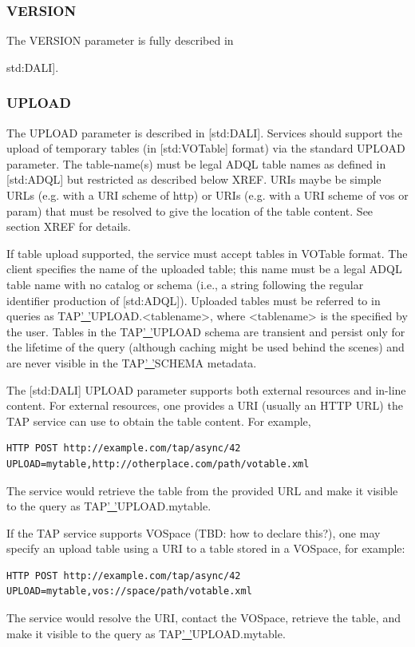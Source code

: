\documentclass[11pt,letter]{ivoa}
\begin{document}
\subsubsection{VERSION}
The VERSION parameter is fully described in {std:DALI].

\subsubsection{UPLOAD}
\label{sec:UPLOAD}

The UPLOAD parameter is described in [std:DALI]. Services should support the 
upload of temporary tables (in [std:VOTable] format) via the standard UPLOAD 
parameter. The table-name(s) must be legal ADQL table names as defined in 
[std:ADQL] but restricted as described below XREF. URIs maybe be simple URLs 
(e.g. with a URI scheme of http) or URIs (e.g. with a URI scheme of vos or 
param) that must be resolved to give the location of the table content. See 
section XREF for details.

If table upload supported, the service must accept tables in VOTable format. 
The client specifies the name of the uploaded table; this name must be a legal 
ADQL table name with no catalog or schema (i.e., a string following the 
regular identifier production of [std:ADQL]). Uploaded tables must be referred 
to in queries as TAP\underline{' '}UPLOAD.<tablename>, where <tablename> is the 
specified by the user. Tables in the TAP\underline{' '}UPLOAD schema are 
transient and persist only for the lifetime of the query (although caching might 
be used behind the scenes) and are never visible in the 
TAP\underline{' '}SCHEMA metadata.

The [std:DALI] UPLOAD parameter supports both external resources and in-line 
content. For external resources, one provides a URI (usually an HTTP URL) the 
TAP service can use to obtain the table content. For example,
\begin{verbatim}
HTTP POST http://example.com/tap/async/42
UPLOAD=mytable,http://otherplace.com/path/votable.xml
\end{verbatim}
The service would retrieve the table from the provided URL and 
make it visible to the query as TAP\underline{' '}UPLOAD.mytable.

If the TAP service supports VOSpace (TBD: how to declare this?), one may 
specify an upload table using a URI to a table stored in a VOSpace, for example:
\begin{verbatim}
HTTP POST http://example.com/tap/async/42
UPLOAD=mytable,vos://space/path/votable.xml
\end{verbatim}
The service would resolve the URI, contact the VOSpace, retrieve the table, and 
make it visible to the query as TAP\underline{' '}UPLOAD.mytable.

}
\end{document}
